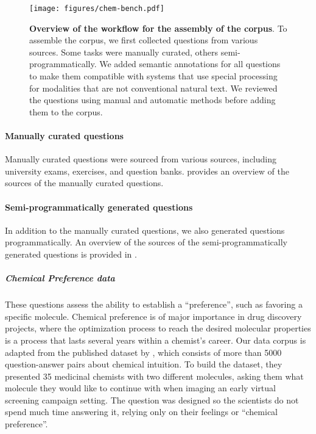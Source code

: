 \documentclass[11pt, oneside]{article}
\begin{document}
\begin{refsection}
\begin{figure}[!h]
    \texttt{[image: figures/chem-bench.pdf]}
    \caption{\textbf{Overview of the workflow for the assembly of the \chembench corpus}. 
    To assemble the \chembench corpus, we first collected questions from various sources. Some tasks were manually curated, others semi-programmatically. We added semantic annotations for all questions to make them compatible with systems that use special processing for modalities that are not conventional natural text. We reviewed the questions using manual and automatic methods before adding them to the corpus.}
    \label{fig:curation_workflow}
\end{figure}

\paragraph{Manually curated questions}
Manually curated questions were sourced from various sources, including university exams, exercises, and question banks.  provides an overview of the sources of the manually curated questions.

%



\paragraph{Semi-programmatically generated questions}
In addition to the manually curated questions, we also generated questions programmatically. An overview of the sources of the semi-programmatically generated questions is provided in .

%

\subparagraph{Chemical Preference data}

These questions assess the ability to establish a \enquote{preference}, such as favoring a specific molecule. Chemical preference is of major importance in drug discovery projects, where the optimization process to reach the desired molecular properties is a process that lasts several years within a chemist's career.
Our data corpus is adapted from the published dataset by \textcite{Choung2023}, which consists of more than 5000 question-answer pairs about chemical intuition. To build the dataset, they presented 35 medicinal chemists with two different molecules, asking them what molecule they would like to continue with when imaging an early virtual screening campaign setting. The question was designed so the scientists do not spend much time answering it, relying only on their feelings or \enquote{chemical preference}.


\end{refsection}
\end{document}
